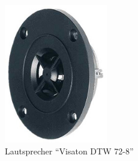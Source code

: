 \begin{figure} [H]
	\centering
	\includegraphics[width=0.4\textwidth]{img/LSMessung/HT/dtw72.jpg}
	\caption[Lautsprecher \enquote{Visaton DTW 72-8}]{Lautsprecher \enquote{Visaton DTW 72-8}\footnotemark}
	\label{fig:4.3.7}
\end{figure}
